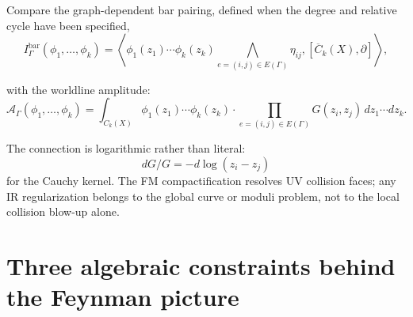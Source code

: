 \begin{evidence}
Compare the graph-dependent bar pairing, defined when the degree and
relative cycle have been specified,
\[
I^{\mathrm{bar}}_\Gamma(\phi_1,\ldots,\phi_k)
= \left\langle
\phi_1(z_1)\cdots\phi_k(z_k)
\bigwedge_{e=(i,j)\in E(\Gamma)}\eta_{ij},
[\overline{C}_k(X),\partial]
\right\rangle,
\]

with the worldline amplitude:
\[
\mathcal{A}_\Gamma(\phi_1,\ldots,\phi_k)
= \int_{C_k(X)} \phi_1(z_1) \cdots \phi_k(z_k)
\cdot \prod_{e=(i,j)\in E(\Gamma)} G(z_i,z_j)\,
dz_1 \cdots dz_k .
\]

The connection is logarithmic rather than literal:
\[
dG/G=-d\log(z_i-z_j)
\]
for the Cauchy kernel.  The FM compactification resolves UV collision
faces; any IR regularization belongs to the global curve or moduli
problem, not to the local collision blow-up alone.
\end{evidence}

\section{Three algebraic constraints behind the Feynman picture}
\label{sec:feynman-anchors}

